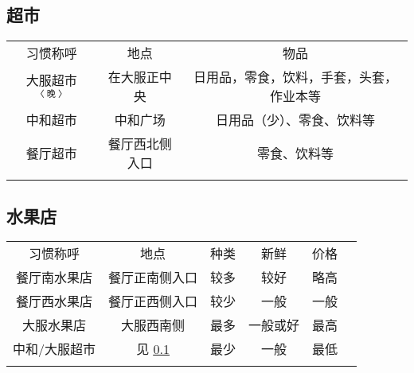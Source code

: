\subsection[超市]{超市}\label{market}
\begin{table}[ht]
    \centering
    \begin{tabular}{|c|c|c|}
        \Xhline{1.2pt}
        习惯称呼         & 地点      & 物品                   \\
        \Xhline{1.2pt}
        大服超市$^{〈晚〉}$ & 在大服正中央  & 日用品，零食，饮料，手套，头套，作业本等 \\
        \hline
        中和超市         & 中和广场    & 日用品（少）、零食、饮料等        \\
        \hline
        餐厅超市         & 餐厅西北侧入口 & 零食、饮料等               \\
        \Xhline{1.2pt}
    \end{tabular}
\end{table}

\subsection[水果店]{水果店}
\begin{table}[!ht]
    \centering
    \begin{tabular}{|c|c|c|c|c|c|}
        \Xhline{1.2pt}
        习惯称呼    & 地点                     & 种类 & 新鲜   & 价格 \\
        \Xhline{1.2pt}
        餐厅南水果店  & 餐厅正南侧入口                & 较多 & 较好   & 略高 \\
        \hline
        餐厅西水果店  & 餐厅正西侧入口                & 较少 & 一般   & 一般 \\
        \hline
        大服水果店   & 大服西南侧                  & 最多 & 一般或好 & 最高 \\
        \hline
        中和/大服超市 & 见 \uline{\ref{market}} & 最少 & 一般   & 最低 \\
        \Xhline{1.2pt}
    \end{tabular}
\end{table}

